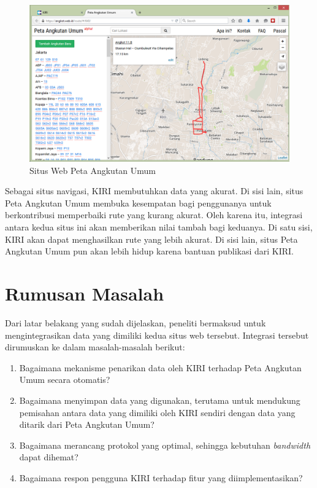 \begin{figure}
	\centering
	\includegraphics[scale=0.5]{Gambar/1_angkotwebid}
	\caption{Situs Web Peta Angkutan Umum}
	\label{fig:1_angkotwebid}
\end{figure}

Sebagai situs navigasi, KIRI membutuhkan data yang akurat. Di sisi lain, situs Peta Angkutan Umum membuka kesempatan bagi penggunanya untuk berkontribusi memperbaiki rute yang kurang akurat. Oleh karena itu, integrasi antara kedua situs ini akan memberikan nilai tambah bagi keduanya. Di satu sisi, KIRI akan dapat menghasilkan rute yang lebih akurat. Di sisi lain, situs Peta Angkutan Umum pun akan lebih hidup karena bantuan publikasi dari KIRI.

\section{Rumusan Masalah}

Dari latar belakang yang sudah dijelaskan, peneliti bermaksud untuk mengintegrasikan data yang dimiliki kedua situs web tersebut. Integrasi tersebut dirumuskan ke dalam masalah-masalah berikut:

\begin{enumerate}
	\item Bagaimana mekanisme penarikan data oleh KIRI terhadap Peta Angkutan Umum secara otomatis?
	\item Bagaimana menyimpan data yang digunakan, terutama untuk mendukung pemisahan antara data yang dimiliki oleh KIRI sendiri dengan data yang ditarik dari Peta Angkutan Umum?
	\item Bagaimana merancang protokol yang optimal, sehingga kebutuhan \textit{bandwidth} dapat dihemat?
	\item Bagaimana respon pengguna KIRI terhadap fitur yang diimplementasikan?
\end{enumerate}

